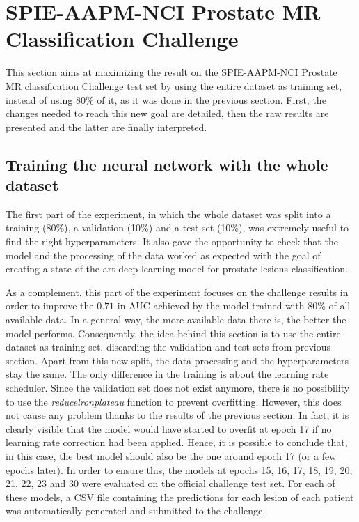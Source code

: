 \newpage
\section{SPIE-AAPM-NCI Prostate MR Classification Challenge}
\label{sec:classification_challenge}
\setlength{\marginparwidth}{3cm}\leavevmode {}This section aims at maximizing the result on the SPIE-AAPM-NCI Prostate MR classification Challenge test set by using the entire dataset as training set, instead of using 80\% of it, as it was done in the previous section. First, the changes needed to reach this new goal are detailed, then the raw results are presented and the latter are finally interpreted.

\subsection{Training the neural network with the whole dataset}
\setlength{\marginparwidth}{3cm}\leavevmode {}The first part of the experiment, in which the whole dataset was split into a training (80\%), a validation (10\%) and a test set (10\%), was extremely useful to find the right hyperparameters. It also gave the opportunity to check that the model and the processing of the data worked as expected with the goal of creating a state-of-the-art deep learning model for prostate lesions classification.

As a complement, this part of the experiment focuses on the challenge results in order to improve the $0.71$ in AUC achieved by the model trained with 80\% of all available data. In a general way, the more available data there is, the better the model performs. Consequently, the idea behind this section is to use the entire dataset as training set, discarding the validation and test sets from previous section. Apart from this new split, the data processing and the hyperparameters stay the same. The only difference in the training is about the learning rate scheduler. Since the validation set does not exist anymore, there is no possibility to use the \textit{reducelronplateau} function to prevent overfitting. However, this does not cause any problem thanks to the results of the previous section. In fact, it is clearly visible that the model would have started to overfit at epoch 17 if no learning rate correction had been applied. Hence, it is possible to conclude that, in this case, the best model should also be the one around epoch 17 (or a few epochs later). In order to ensure this, the models at epochs 15, 16, 17, 18, 19, 20, 21, 22, 23 and 30 were evaluated on the official challenge test set. For each of these models, a CSV file containing the predictions for each lesion of each patient was automatically generated and submitted to the challenge.

